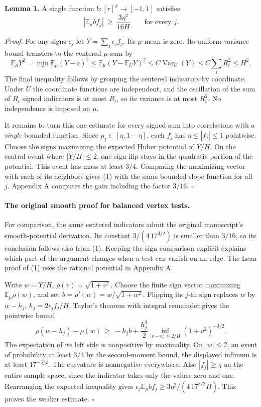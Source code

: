 \documentclass[
  11pt,
]{article}
\begin{document}
\textbf{Lemma 1.} A single function \(b:[r]^k\to[-1,1]\) satisfies \[
             |\mathbb E_\mu b f_j|\ \ge\
                 \frac{3\eta^2}{16H}
                       \qquad\text{for every }j .
 \tag{1}
\]

\emph{Proof.} For any signs \(\epsilon_j\) let
\(Y=\sum_j\epsilon_j f_j\). Its \(\mu\)-mean is zero. Its
uniform-variance bound transfers to the centered \(\mu\)-sum by \[
 \mathbb E_\mu Y^2
   =\min_c\mathbb E_\mu(Y-c)^2
   \le \mathbb E_\mu(Y-\mathbb E_UY)^2
   \le C\operatorname{Var}_U(Y)
   \le C\sum_i R_i^2\le H^2 .
\] The final inequality follows by grouping the centered indicators by
coordinate. Under \(U\) the coordinate functions are independent, and
the oscillation of the sum of \(R_i\) signed indicators is at most
\(R_i\), so its variance is at most \(R_i^2\). No independence is
imposed on \(\mu\).

It remains to turn this one estimate for every signed sum into correlations
with a \emph{single} bounded function. Since \(p_j\in[\eta,1-\eta]\), each
\(f_j\) has \(\eta\le |f_j|\le1\) pointwise. Choose the signs maximizing
the expected Huber potential of \(Y/H\). On the central event where
\(|Y/H|\le2\), one sign flip stays in the quadratic portion of the potential.
This event has mass at least \(3/4\). Comparing the maximizing vector with
each of its neighbors gives (1) with the same bounded slope function for all
\(j\). Appendix A computes the gain including the factor \(3/16\).
\(\square\)

\paragraph{The original smooth proof for balanced vertex tests.}
For comparison, the same centered indicators admit the original manuscript's
smooth-potential derivation. Its constant
\(3/(4\,17^{3/2})\) is smaller than \(3/16\), so its conclusion follows
also from (1). Keeping the sign comparison explicit explains which part
of the argument changes when a test can vanish on an edge. The Lean
proof of (1) uses the rational potential in Appendix A.

Write \(w=Y/H\), \(\rho(v)=\sqrt{1+v^2}\). Choose the finite sign vector
maximizing \(\mathbb E_\mu\rho(w)\), and set
\(b=\rho'(w)=w/\sqrt{1+w^2}\). Flipping its \(j\)-th sign replaces \(w\)
by \(w-h_j\), \(h_j=2\epsilon_j f_j/H\). Taylor's theorem with integral
remainder gives the pointwise bound \[
        \rho(w-h_j)-\rho(w)\ \ge\
        -h_j b+\frac{h_j^2}{2}
          \inf_{|v-w|\le 2/H}(1+v^2)^{-3/2}.
\] The expectation of its left side is nonpositive by maximality. On
\(|w|\le2\), an event of probability at least \(3/4\) by the
second-moment bound, the displayed infimum is at least \(17^{-3/2}\).
The curvature is nonnegative everywhere. Also \(|f_j|\ge\eta\) on the
entire sample space, since the indicator takes only the values zero and
one. Rearranging the expected inequality gives
\(\epsilon_j\mathbb E_\mu bf_j\ge3\eta^2/(4\,17^{3/2}H)\). This proves
the weaker estimate. \(\square\)
\end{document}
